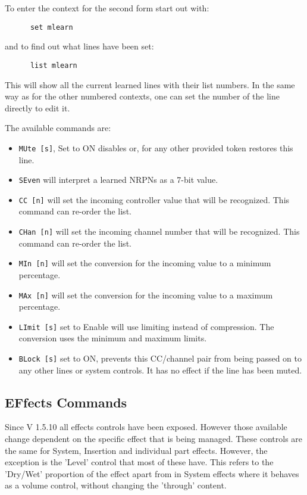    To enter the context for the second form start out with:
   \begin{verbatim}
      set mlearn
   \end{verbatim}
   and to find out what lines have been set:
   \begin{verbatim}
      list mlearn
   \end{verbatim}
   This will show all the current learned lines with their list numbers.
   In the same way as for the other numbered contexts, one can set the number
   of the line directly to edit it.

   The available commands are:

   \begin{itemize}
      \item \texttt{MUte [s]}, Set to ON disables or, for any other provided token
         restores this line.
      \item \texttt{SEven} will interpret a learned NRPNs as a 7-bit value.
      \item \texttt{CC [n]} will set the incoming controller value that will
         be recognized.  This command can re-order the list.
      \item \texttt{CHan [n]} will set the incoming channel number that will
         be recognized.  This command can re-order the list.
      \item \texttt{MIn [n]} will set the conversion for the incoming
         value to a minimum percentage.
      \item \texttt{MAx [n]} will set the conversion for the incoming
         value to a maximum percentage.
      \item \texttt{LImit [s]} set to Enable will use limiting instead of
         compression.  The conversion uses the minimum and maximum limits.
      \item \texttt{BLock [s]} set to ON, prevents this CC/channel pair from
        being passed on to any other lines or system controls.  It has no effect
        if the line has been muted.
   \end{itemize}

\subsection{EFfects Commands}
\label{subsec:command_line_effects}
   Since V 1.5.10 all effects controls have been exposed. However those
   available change dependent on the specific effect that is being managed.
   These controls are the same for System, Insertion and individual part
   effects. However, the exception is the 'Level' control that most of these
   have. This refers to the 'Dry/Wet' proportion of the effect apart from in
   System effects where it behaves as a volume control, without changing the
   'through' content.

